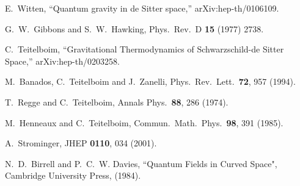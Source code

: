 \documentclass[a4paper,preprintnumbers,amsmath,amssymb]{revtex4}
\begin{document}
\begin{thebibliography}{}

E.~Witten,
``Quantum gravity in de Sitter space,''
arXiv:hep-th/0106109.

G.~W.~Gibbons and S.~W.~Hawking,
Phys.\ Rev.\ D {\bf 15} (1977) 2738.


C.~Teitelboim,
``Gravitational Thermodynamics of Schwarzschild-de Sitter Space,''
arXiv:hep-th/0203258.

M.~Banados, C.~Teitelboim and J.~Zanelli,
Phys.\ Rev.\ Lett.\  {\bf 72}, 957 (1994).

T.~Regge and C.~Teitelboim,
Annals Phys.\  {\bf 88}, 286 (1974).

M.~Henneaux and C.~Teitelboim,
Commun.\ Math.\ Phys.\  {\bf 98}, 391 (1985).

A.~Strominger,
JHEP {\bf 0110}, 034 (2001).

N.~D.~Birrell  and  P.~C.~W. Davies,
``Quantum Fields in Curved Space",
Cambridge University Press, (1984).

\end{thebibliography}
\end{document}
